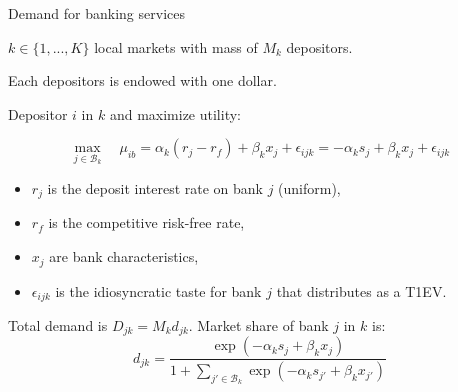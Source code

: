 \documentclass[notes,10pt, aspectratio=169]{beamer}
\newenvironment{wideitemize}{\itemize\addtolength{\itemsep}{10pt}}{\enditemize}
\begin{document}
    \begin{frame}{ Demand for banking services}
    
        \begin{wideitemize}

            \item $k \in \{1, ..., K\}$ local markets with mass of $M_k$ depositors.
            
            \item Each depositors is endowed with one dollar.
    
            \item Depositor $i$ in $k$ and maximize utility:
            
            \begin{equation}
            \max _{j \in \mathcal{B}_k} \quad \mu_{i b}=\alpha_{k} (r_j - r_f) + \beta_k x_j + \epsilon_{ijk} = - \alpha_{k} s_j + \beta_k x_j + \epsilon_{ijk}
            \end{equation}
    
            \begin{itemize}
                \item $r_j$ is the deposit interest rate on bank $j$ (uniform), 
                \item $r_f$ is the competitive risk-free rate,
                \item $x_j$ are bank characteristics,
                \item $\epsilon_{ijk}$ is the idiosyncratic taste for bank $j$ that distributes as a T1EV.
            \end{itemize}
  
            \item Total demand is $D_{jk} = M_k d_{jk}$.
            Market share of bank $j$ in $k$ is: 
            $$ 
            d_{jk} = \frac{\exp (-\alpha_k s_j + \beta_k x_j)}{1 + \sum_{j' \in \mathcal{B}_k} \exp (-\alpha_k s_{j'} + \beta_k x_{j'})}
            $$
        \end{wideitemize}
    
    
        \end{frame}
\end{document}
